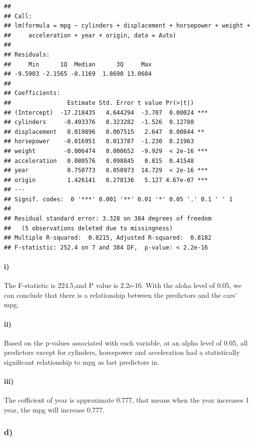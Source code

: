 \documentclass[]{article}
\let\oldparagraph\paragraph
\renewcommand{\paragraph}[1]{\oldparagraph{#1}\mbox{}}
\begin{document}
\begin{verbatim}
## 
## Call:
## lm(formula = mpg ~ cylinders + displacement + horsepower + weight + 
##     acceleration + year + origin, data = Auto)
## 
## Residuals:
##     Min      1Q  Median      3Q     Max 
## -9.5903 -2.1565 -0.1169  1.8690 13.0604 
## 
## Coefficients:
##                Estimate Std. Error t value Pr(>|t|)    
## (Intercept)  -17.218435   4.644294  -3.707  0.00024 ***
## cylinders     -0.493376   0.323282  -1.526  0.12780    
## displacement   0.019896   0.007515   2.647  0.00844 ** 
## horsepower    -0.016951   0.013787  -1.230  0.21963    
## weight        -0.006474   0.000652  -9.929  < 2e-16 ***
## acceleration   0.080576   0.098845   0.815  0.41548    
## year           0.750773   0.050973  14.729  < 2e-16 ***
## origin         1.426141   0.278136   5.127 4.67e-07 ***
## ---
## Signif. codes:  0 '***' 0.001 '**' 0.01 '*' 0.05 '.' 0.1 ' ' 1
## 
## Residual standard error: 3.328 on 384 degrees of freedom
##   (5 observations deleted due to missingness)
## Multiple R-squared:  0.8215, Adjusted R-squared:  0.8182 
## F-statistic: 252.4 on 7 and 384 DF,  p-value: < 2.2e-16
\end{verbatim}

\paragraph{i)}\label{i-1}

The F-statistic is 224.5,and P value is 2.2e-16. With the aloha level of
0.05, we can conclude that there is a relationship between the
predictors and the cars' mpg.

\paragraph{ii)}\label{ii-1}

Based on the p-values associated with each variable, at an alpha level
of 0.05, all predictors except for cylinders, horsepower and
acceleration had a statistically significant relationship to mpg as last
predictors in.

\paragraph{iii)}\label{iii-1}

The cofficient of year is approximate 0.777, that means when the year
increases 1 year, the mpg will increase 0.777.

\subsubsection{d)}\label{d-1}
\end{document}
